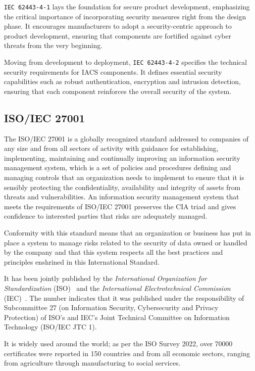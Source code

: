\texttt{IEC 62443-4-1} lays the foundation for secure product development, emphasizing the critical importance of incorporating security measures right from the design phase. It encourages manufacturers to adopt a security-centric approach to product development, ensuring that components are fortified against cyber threats from the very beginning.

Moving from development to deployment, \texttt{IEC 62443-4-2} specifies the technical security requirements for IACS components. It defines essential security capabilities such as robust authentication, encryption and intrusion detection, ensuring that each component reinforces the overall security of the system.~\cite{iec-62443-safeguarding-industrial-automation-linkedin}


\subsection{ISO/IEC 27001}

The ISO/IEC 27001 is a globally recognized standard addressed to companies of any size and from all sectors of activity with guidance for establishing, implementing, maintaining and continually improving an information security management system, which is a set of policies and procedures defining and managing controls that an organization needs to implement to ensure that it is sensibly protecting the confidentiality, availability and integrity of assets from threats and vulnerabilities. An information security management system that meets the requirements of ISO/IEC 27001 preserves the CIA triad and gives confidence to interested parties that risks are adequately managed.

Conformity with this standard means that an organization or business has put in place a system to manage risks related to the security of data owned or handled by the company and that this system respects all the best practices and principles enshrined in this International Standard.

It has been jointly published by the \textit{International Organization for Standardization} (ISO)~\cite{iso} and the \textit{International Electrotechnical Commission} (IEC)~\cite{iec}. The number indicates that it was published under the responsibility of Subcommittee 27 (on Information Security, Cybersecurity and Privacy Protection) of ISO's and IEC's Joint Technical Committee on Information Technology (ISO/IEC JTC 1).

It is widely used around the world; as per the ISO Survey 2022, over 70000 certificates were reported in 150 countries and from all economic sectors, ranging from agriculture through manufacturing to social services.~\cite{iso-27001}

